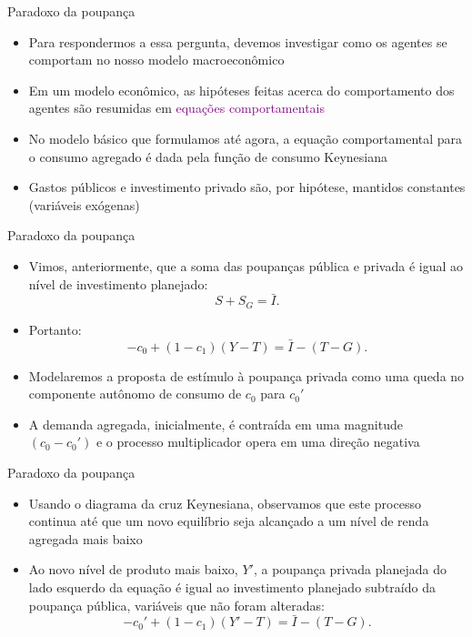 \documentclass[10pt]{beamer}
\begin{document}
\begin{frame}{Paradoxo da poupança}
    \begin{itemize}
        \item Para respondermos a essa pergunta, devemos investigar como os agentes se comportam no nosso modelo macroeconômico\bigskip

        \item Em um modelo econômico, as hipóteses feitas acerca do comportamento dos agentes são resumidas em \textcolor{purple}{equações comportamentais}\bigskip

        \item No modelo básico que formulamos até agora, a equação comportamental para o consumo agregado é dada pela função de consumo Keynesiana\bigskip

        \item Gastos públicos e investimento privado são, por hipótese, mantidos constantes (variáveis exógenas)
    \end{itemize}
\end{frame}

\begin{frame}{Paradoxo da poupança}
    \begin{itemize}
        \item Vimos, anteriormente, que a soma das poupanças pública e privada é igual ao nível de investimento planejado:
              \[
                  S + S_G = \bar{I}.
              \]

        \item Portanto:
              \[
                  -c_0 + (1-c_1)(Y-T) = \bar{I} - (T-G).
              \]

        \item Modelaremos a proposta de estímulo à poupança privada como uma queda no componente autônomo de consumo de $c_0$ para $c_0'$\bigskip

        \item A demanda agregada, inicialmente, é contraída em uma magnitude $(c_0-c_0')$ e o processo multiplicador opera em uma direção negativa
    \end{itemize}
\end{frame}

\begin{frame}{Paradoxo da poupança}
    \begin{itemize}
        \item Usando o diagrama da cruz Keynesiana, observamos que este processo continua até que um novo equilíbrio seja alcançado a um nível de renda agregada mais baixo\bigskip

        \item Ao novo nível de produto mais baixo, $Y'$, a poupança privada planejada do lado esquerdo da equação é igual ao investimento planejado subtraído da poupança pública, variáveis que não foram alteradas:
              \[
                  -c_0' + (1-c_1)(Y'-T) = \bar{I} - (T-G).
              \]
    \end{itemize}
\end{frame}
\end{document}
